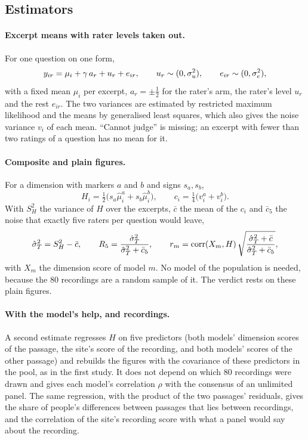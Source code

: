 \subsection{Estimators}\label{sec:secondmethods}

\paragraph{Excerpt means with rater levels taken out.} For one question on one form,
\begin{equation}\label{eq:crossed}
  y_{ir} = \mu_i + \gamma\,a_r + u_r + e_{ir}, \qquad u_r \sim (0, \sigma_u^2), \qquad e_{ir} \sim (0, \sigma_e^2),
\end{equation}
with a fixed mean $\mu_i$ per excerpt, $a_r = \pm\tfrac12$ for the rater's arm, the rater's level $u_r$ and the
rest $e_{ir}$. The two variances are estimated by restricted maximum likelihood and the means by generalised
least squares, which also gives the noise variance $v_i$ of each mean. ``Cannot judge'' is missing; an excerpt
with fewer than two ratings of a question has no mean for it.

\paragraph{Composite and plain figures.} For a dimension with markers $a$ and $b$ and signs $s_a, s_b$,
\begin{equation}
  H_i = \tfrac12\bigl(s_a\hat\mu_i^{a} + s_b\hat\mu_i^{b}\bigr), \qquad c_i = \tfrac14\bigl(v_i^{a} + v_i^{b}\bigr) .
\end{equation}
With $S_H^2$ the variance of $H$ over the excerpts, $\bar c$ the mean of the $c_i$ and $\bar c_5$ the noise that
exactly five raters per question would leave,
\begin{equation}\label{eq:plain}
  \hat\sigma_T^2 = S_H^2 - \bar c, \qquad
  R_{5} = \frac{\hat\sigma_T^2}{\hat\sigma_T^2 + \bar c_5}, \qquad
  r_m = \operatorname{corr}(X_m, H)\,\sqrt{\frac{\hat\sigma_T^2 + \bar c}{\hat\sigma_T^2 + \bar c_5}},
\end{equation}
with $X_m$ the dimension score of model $m$. No model of the population is needed, because the 80 recordings
are a random sample of it. The verdict rests on these plain figures.

\paragraph{With the model's help, and recordings.} A second estimate regresses $H$ on five predictors (both
models' dimension scores of the passage, the site's score of the recording, and both models' scores of the other
passage) and rebuilds the figures with the covariance of these predictors in the pool, as in the first study. It
does not depend on which 80 recordings were drawn and gives each model's correlation $\rho$ with the consensus of
an unlimited panel. The same regression, with the product of the two passages' residuals, gives the share of
people's differences between passages that lies between recordings, and the correlation of the site's recording
score with what a panel would say about the recording.

